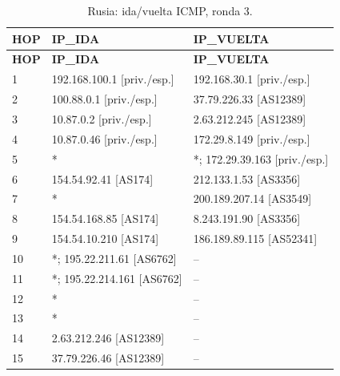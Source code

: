 \begin{longtable}{p{0.95cm}p{7.075cm}p{7.075cm}}
\caption{Rusia: ida/vuelta ICMP, ronda 3.}\label{anexo:vuelta:37.79.226.46:ICMP:3} \\
\toprule
\textbf{HOP} & \textbf{IP\_\allowbreak{}IDA} & \textbf{IP\_\allowbreak{}VUELTA} \\ \midrule
\endfirsthead
\toprule
\textbf{HOP} & \textbf{IP\_\allowbreak{}IDA} & \textbf{IP\_\allowbreak{}VUELTA} \\ \midrule
\endhead
1 & 192.168.100.1 [priv./esp.] & 192.168.30.1 [priv./esp.] \\
2 & 100.88.0.1 [priv./esp.] & 37.79.226.33 [AS12389] \\
3 & 10.87.0.2 [priv./esp.] & 2.63.212.245 [AS12389] \\
4 & 10.87.0.46 [priv./esp.] & 172.29.8.149 [priv./esp.] \\
5 & * & *; 172.29.39.163 [priv./esp.] \\
6 & 154.54.92.41 [AS174] & 212.133.1.53 [AS3356] \\
7 & * & 200.189.207.14 [AS3549] \\
8 & 154.54.168.85 [AS174] & 8.243.191.90 [AS3356] \\
9 & 154.54.10.210 [AS174] & 186.189.89.115 [AS52341] \\
10 & *; 195.22.211.61 [AS6762] & -- \\
11 & *; 195.22.214.161 [AS6762] & -- \\
12 & * & -- \\
13 & * & -- \\
14 & 2.63.212.246 [AS12389] & -- \\
15 & 37.79.226.46 [AS12389] & -- \\
\bottomrule
\end{longtable}
\endgroup
\begingroup
\fontsize{9}{11}\selectfont
